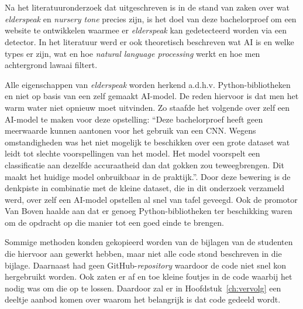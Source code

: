 
\chapter{}
\label{ch:methodologie}


Na het literatuuronderzoek dat uitgeschreven is in de stand van zaken over wat \textit{elderspeak} en \textit{nursery tone} precies zijn, is het doel van deze bachelorproef om een website te ontwikkelen waarmee er \textit{elderspeak} kan gedetecteerd worden via een detector. In het literatuur werd er ook theoretisch beschreven wat AI is en welke types er zijn, wat en hoe \textit{natural language processing} werkt en hoe men achtergrond lawaai filtert.

Alle eigenschappen van \textit{elderspeak} worden herkend a.d.h.v. Python-bibliotheken en niet op basis van een zelf gemaakt AI-model. De reden hiervoor is dat men het warm water niet opnieuw moet uitvinden. Zo staafde \textcite{Beeckman2021} het volgende over zelf een AI-model te maken voor deze opstelling: ``Deze bachelorproef heeft geen meerwaarde kunnen aantonen voor het gebruik van een CNN. Wegens omstandigheden was het niet mogelijk te beschikken over een grote dataset wat leidt tot slechte voorspellingen van het model. Het model voorspelt een classificatie aan dezelfde accuraatheid dan dat gokken zou teweegbrengen. Dit maakt het huidige model onbruikbaar in de praktijk.''. Door deze bewering is de denkpiste in combinatie met de kleine dataset, die in dit onderzoek verzameld werd, over zelf een AI-model opstellen al snel van tafel geveegd. Ook de promotor Van Boven haalde aan dat er genoeg Python-bibliotheken ter beschikking waren om de opdracht op die manier tot een goed einde te brengen.

Sommige methoden konden gekopieerd worden van de bijlagen van de studenten die hiervoor aan gewerkt hebben, maar niet alle code stond beschreven in die bijlage. Daarnaast had \textcite{Standaert2021} geen GitHub-\textit{repository} waardoor de code niet snel kon hergebruikt worden. Ook zaten er af en toe kleine foutjes in de code waarbij het nodig was om die op te lossen. Daardoor zal er in Hoofdstuk~\ref{ch:vervolg} een deeltje aanbod komen over waarom het belangrijk is dat code gedeeld wordt.


